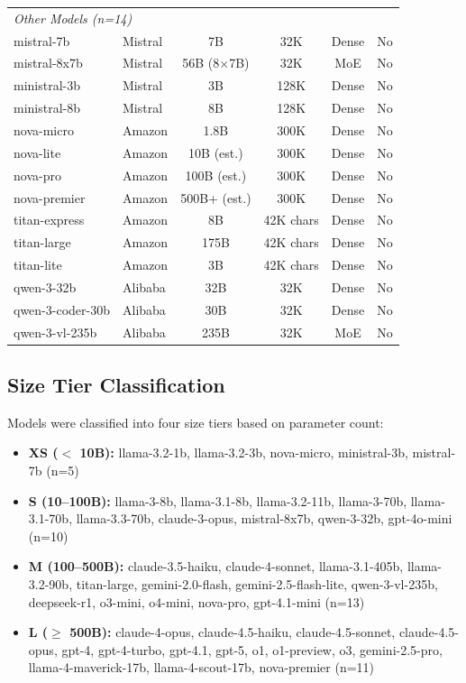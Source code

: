 \documentclass{article}
\begin{document}
\begin{table}[t]
\begin{tabular}{llcccc}
\midrule
\multicolumn{6}{l}{\textit{Other Models (n=14)}} \\
mistral-7b & Mistral & 7B & 32K & Dense & No \\
mistral-8x7b & Mistral & 56B (8$\times$7B) & 32K & MoE & No \\
ministral-3b & Mistral & 3B & 128K & Dense & No \\
ministral-8b & Mistral & 8B & 128K & Dense & No \\
nova-micro & Amazon & 1.8B & 300K & Dense & No \\
nova-lite & Amazon & 10B (est.) & 300K & Dense & No \\
nova-pro & Amazon & 100B (est.) & 300K & Dense & No \\
nova-premier & Amazon & 500B+ (est.) & 300K & Dense & No \\
titan-express & Amazon & 8B & 42K chars & Dense & No \\
titan-large & Amazon & 175B & 42K chars & Dense & No \\
titan-lite & Amazon & 3B & 42K chars & Dense & No \\
qwen-3-32b & Alibaba & 32B & 32K & Dense & No \\
qwen-3-coder-30b & Alibaba & 30B & 32K & Dense & No \\
qwen-3-vl-235b & Alibaba & 235B & 32K & MoE & No \\
\bottomrule
\end{tabular}
\end{table}

\subsection{Size Tier Classification}

Models were classified into four size tiers based on parameter count:

\begin{itemize}[itemsep=2pt,topsep=3pt,parsep=0pt]
    \item \textbf{XS ($<$ 10B):} llama-3.2-1b, llama-3.2-3b, nova-micro, ministral-3b, mistral-7b (n=5)
    \item \textbf{S (10--100B):} llama-3-8b, llama-3.1-8b, llama-3.2-11b, llama-3-70b, llama-3.1-70b, llama-3.3-70b, claude-3-opus, mistral-8x7b, qwen-3-32b, gpt-4o-mini (n=10)
    \item \textbf{M (100--500B):} claude-3.5-haiku, claude-4-sonnet, llama-3.1-405b, llama-3.2-90b, titan-large, gemini-2.0-flash, gemini-2.5-flash-lite, qwen-3-vl-235b, deepseek-r1, o3-mini, o4-mini, nova-pro, gpt-4.1-mini (n=13)
    \item \textbf{L ($\geq$ 500B):} claude-4-opus, claude-4.5-haiku, claude-4.5-sonnet, claude-4.5-opus, gpt-4, gpt-4-turbo, gpt-4.1, gpt-5, o1, o1-preview, o3, gemini-2.5-pro, llama-4-maverick-17b, llama-4-scout-17b, nova-premier (n=11)
\end{itemize}
\end{document}
